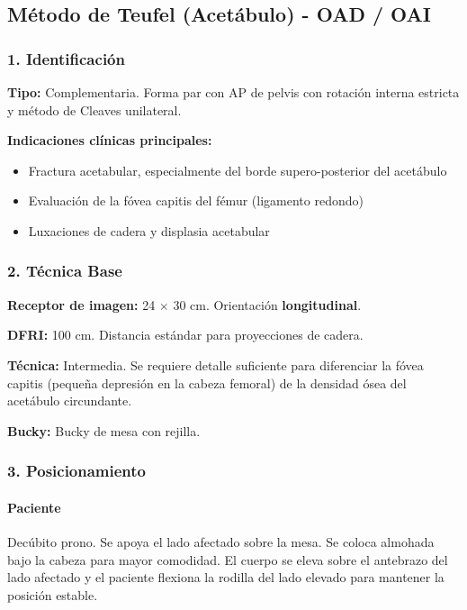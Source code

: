 	\subsection{Método de Teufel (Acetábulo) - OAD / OAI}
	
	\subsubsection*{1. Identificación}
	
	\textbf{Tipo:} Complementaria. Forma par con AP de pelvis con rotación interna estricta y método de Cleaves unilateral.
	
	\textbf{Indicaciones clínicas principales:}
	\begin{itemize}
		\item Fractura acetabular, especialmente del borde supero-posterior del acetábulo
		\item Evaluación de la fóvea capitis del fémur (ligamento redondo)
		\item Luxaciones de cadera y displasia acetabular
	\end{itemize}
	
	\subsubsection*{2. Técnica Base}
	
	\textbf{Receptor de imagen:} 24 $\times$ 30 cm. Orientación \textbf{longitudinal}.
	
	\textbf{DFRI:} 100 cm. Distancia estándar para proyecciones de cadera.
	
	\textbf{Técnica:} Intermedia. Se requiere detalle suficiente para diferenciar la fóvea capitis (pequeña depresión en la cabeza femoral) de la densidad ósea del acetábulo circundante.
	
	\textbf{Bucky:} Bucky de mesa con rejilla.
	
	\subsubsection*{3. Posicionamiento}
	
	\paragraph{Paciente}
	Decúbito prono. Se apoya el lado afectado sobre la mesa. Se coloca almohada bajo la cabeza para mayor comodidad. El cuerpo se eleva sobre el antebrazo del lado afectado y el paciente flexiona la rodilla del lado elevado para mantener la posición estable.
	
